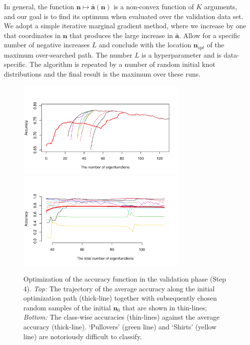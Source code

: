 \begin{enumerate}[leftmargin=0.2cm]
In general, the function $\mathbf n\mapsto \bar {\mathbf a}(\mathbf n)$ is a non-convex function of $K$ arguments, and our goal is to find its optimum when evaluated over the validation data set.  
We adopt a simple iterative marginal gradient method, where we increase by one that coordinates in $\mathbf n$ that produces the large increase in $\bar {\mathbf a}$. 
Allow for a specific number of negative increases $L$ and conclude with the location $\mathbf n_{opt}$ of the maximum over-searched path.  
The number $L$ is a hyperparameter and is data-specific. 
The algorithm is repeated by a number of random initial knot distributions and the final result is the maximum over these runs.
 \begin{figure}[t!]
  \centering
\includegraphics[width=0.75\textwidth]{figures/Fig9Left.pdf}\vspace{-1.5cm}\\
\includegraphics[width=0.75\textwidth]{figures/Fig9Right.pdf}\vspace{-0.4cm}

  \caption{\footnotesize Optimization of the accuracy function in the validation phase (Step 4). \emph{ Top:} The trajectory of the average accuracy along the initial optimization path (thick-line) together with subsequently chosen random samples of the initial $\mathbf n_0$ that are shown in thin-lines; \emph{ Bottom:} The class-wise accuracies (thin-lines) against the average accuracy (thick-line). `Pullovers' (green line) and `Shirts' (yellow line) are notoriously difficult to classify.  }
  \label{VAL}
  \end{figure}


\end{enumerate}

